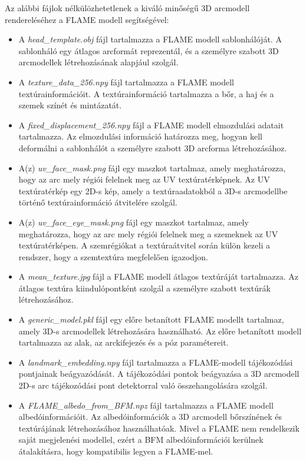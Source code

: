 \documentclass[12pt,a4]{article}
\begin{document}
    Az alábbi fájlok nélkülözhetetlenek a kiváló minőségű 3D arcmodell rendereléséhez a FLAME modell segítségével:
    \begin{itemize}
        \item A \textit{head\_template.obj} fájl tartalmazza a FLAME modell sablonhálóját. A sablonháló egy átlagos arcformát reprezentál, és a személyre szabott 3D arcmodellek létrehozásának alapjául szolgál.
        
        \item A \textit{texture\_data\_256.npy} fájl tartalmazza a FLAME modell textúrainformációit. A textúrainformáció tartalmazza a bőr, a haj és a szemek színét és mintázatát.
        
        \item A \textit{fixed\_displacement\_256.npy}  fájl a FLAME modell elmozdulási adatait tartalmazza. Az elmozdulási információ határozza meg, hogyan kell deformálni a sablonhálót a személyre szabott 3D arcforma létrehozásához.
        
        \item A(z) \textit{uv\_face\_mask.png} fájl egy maszkot tartalmaz, amely meghatározza, hogy az arc mely régiói felelnek meg az UV textúratérképnek. Az UV textúratérkép egy 2D-s kép, amely a textúraadatokból a 3D-s arcmodellbe történő textúrainformáció átvitelére szolgál.
        
        \item A(z) \textit{uv\_face\_eye\_mask.png} fájl egy maszkot tartalmaz, amely meghatározza, hogy az arc mely régiói felelnek meg a szemeknek az UV textúratérképen. A szemrégiókat a textúraátvitel során külön kezeli a rendszer, hogy a szemtextúra megfelelően igazodjon.
        
        \item A \textit{mean\_texture.jpg} fájl a FLAME modell átlagos textúráját tartalmazza. Az átlagos textúra kiindulópontként szolgál a személyre szabott textúrák létrehozásához.

        \item A \textit{generic\_model.pkl} fájl egy előre betanított FLAME modellt tartalmaz, amely 3D-s arcmodellek létrehozására használható. Az előre betanított modell tartalmazza az alak, az arckifejezés és a póz paramétereit.

        \item A \textit{landmark\_embedding.npy} fájl tartalmazza a FLAME-modell tájékozódási pontjainak beágyazódását. A tájékozódási pontok beágyazása a 3D arcmodell 2D-s arc tájékozódási pont detektorral való összehangolására szolgál.

        \item A \textit{FLAME\_albedo\_from\_BFM.npz} fájl tartalmazza a FLAME modell albedóinformációit. Az albedóinformációk a 3D arcmodell bőrszínének és textúrájának létrehozásához használhatóak. Mivel a FLAME nem rendelkezik saját megjelenési modellel, ezért a BFM albedóinformációi kerülnek átalakításra, hogy kompatibilis legyen a FLAME-mel.
        
    \end{itemize}
\end{document}
